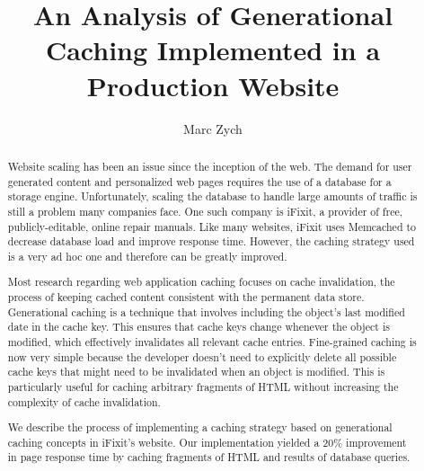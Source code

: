 \documentclass[12pt]{ucthesis}
\begin{document}

\title{An Analysis of Generational Caching Implemented in a Production Website}
\author{Marc Zych}
  
 
     



\maketitle

\begin{frontmatter}

\copyrightpage

\committeemembershippage

\begin{abstract}
Website scaling has been an issue since the inception of the web.
The demand for user generated content and personalized web pages requires the use of a database for a storage engine.
Unfortunately, scaling the database to handle large amounts of traffic is still a problem many companies face.
One such company is \textsf{iFixit}, a provider of free, publicly-editable, online repair manuals.
Like many websites, \textsf{iFixit} uses \textsf{Memcached} to decrease database load and improve response time.
However, the caching strategy used is a very ad hoc one and therefore can be greatly improved.

Most research regarding web application caching focuses on cache invalidation, the process of keeping cached content consistent with the permanent data store.
Generational caching is a technique that involves including the object's last modified date in the cache key.
This ensures that cache keys change whenever the object is modified, which effectively invalidates all relevant cache entries.
Fine-grained caching is now very simple because the developer doesn't need to explicitly delete all possible cache keys that might need to be invalidated when an object is modified.
This is particularly useful for caching arbitrary fragments of HTML without increasing the complexity of cache invalidation.

We describe the process of implementing a caching strategy based on generational caching concepts in \textsf{iFixit}'s website.
Our implementation yielded a 20\% improvement in page response time by caching fragments of HTML and results of database queries.
\end{abstract}


\tableofcontents


\listoftables

\listoffigures

\end{frontmatter}
\end{document}
